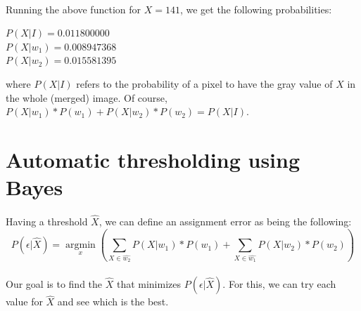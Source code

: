 \paragraph{}
Running the above function for $X=141$, we get the following probabilities:
\begin{center}
    $P(X|I) = 0.011800000$
    \\
    $P(X|w_1) = 0.008947368$
    \\
    $P(X|w_2) = 0.015581395$
\end{center}
where $P(X|I)$ refers to the probability of a pixel to have the gray value of $X$ in the whole (merged) image. Of course, $P(X|w_1) * P(w_1) + P(X|w_2) * P(w_2) = P(X|I)$.

\clearpage

\section{Automatic thresholding using Bayes}

\paragraph{}
Having a threshold $\hat{X}$, we can define an assignment error as being the following:
$$P(\epsilon | \hat{X}) = \underset{x}{\operatorname{argmin}}
(
\underset{X\in\hat{w_2}}{\sum} P(X|w_1) * P(w_1)
+
\underset{X\in\hat{w_1}}{\sum} P(X|w_2) * P(w_2)
)
$$
\paragraph{}
Our goal is to find the $\hat{X}$ that minimizes $P(\epsilon | \hat{X})$.
For this, we can try each value for $\hat{X}$ and see which is the best.